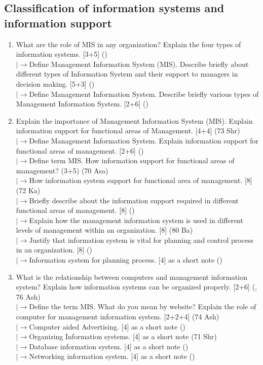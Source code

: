 \documentclass[12pt]{article}
\newcommand{\lb}{\\$\left|\rightarrow\right.$}
\begin{document}
  \subsection{Classification of information systems and information support}
    \begin{enumerate}[topsep=0pt, noitemsep]
      \item What are the role of MIS in any organization? Explain the four types of information systems. \hfill [3+5] ()
        \lb Define Management Information System (MIS). Describe briefly about different types of Information System and their support to managers in decision making. \hfill [5+3] ()
        \lb Define Management Information System. Describe briefly various types of Management Information System. \hfill [2+6] ()

      \item Explain the importance of Management Information System (MIS). Explain information support for functional areas of Management. \hfill [4+4] (73 Shr)
        \lb Define Management Information System. Explain information support for functional areas of management. \hfill [2+6] ()
        \lb Define term MIS. How information support for functional areas of management? \hfill (3+5) (70 Asa)
        \lb How information system support for functional area of management. \hfill [8] (72 Ka)
        \lb Briefly describe about the information support required in different functional areas of management. \hfill [8] ()
        \lb Explain how the management information system is used in different levels of management within an organization. \hfill [8] (80 Ba)
        \lb Justify that information system is vital for planning and control process in an organization. \hfill [8] ()
        \lb Information system for planning process. \hfill [4] as a short note ()

      \item What is the relationship between computers and management information system? Explain how information systems can be organized properly. \hfill [2+6] (, 76 Ash)
        \lb Define the term MIS. What do you mean by website? Explain the role of computer for management information system. \hfill [2+2+4] (74 Ash)
        \lb Computer aided Advertising. \hfill [4] as a short note ()
        \lb Organizing Information systems. \hfill [4] as a short note (71 Shr)
        \lb Database information system. \hfill [4] as a short note ()
        \lb Networking information system. \hfill [4] as a short note ()
    \end{enumerate}
\end{document}
